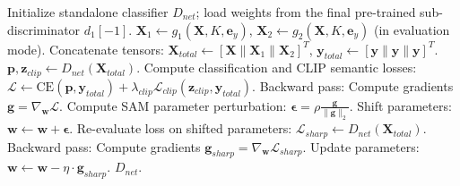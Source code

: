 \begin{algorithm}[H]
\begin{algorithmic}[1]
\STATE {}
\STATE Initialize standalone classifier $D_{net}$; load weights from the final pre-trained sub-discriminator $d_1[-1]$.
        \STATE $\mathbf{X}_1 \leftarrow g_1(\mathbf{X}, K, \mathbf{e}_y)$, $\mathbf{X}_2 \leftarrow g_2(\mathbf{X}, K, \mathbf{e}_y)$ (in evaluation mode).
        \STATE Concatenate tensors: $\mathbf{X}_{total} \leftarrow [\mathbf{X} \parallel \mathbf{X}_1 \parallel \mathbf{X}_2]^T$, $\mathbf{y}_{total} \leftarrow [\mathbf{y} \parallel \mathbf{y} \parallel \mathbf{y}]^T$.
        \STATE $\mathbf{p}, \mathbf{z}_{clip} \leftarrow D_{net}(\mathbf{X}_{total})$.
        \STATE Compute classification and CLIP semantic losses: $\mathcal{L} \leftarrow \text{CE}(\mathbf{p}, \mathbf{y}_{total}) + \lambda_{clip} \mathcal{L}_{clip}(\mathbf{z}_{clip}, \mathbf{y}_{total})$.
        \STATE Backward pass: Compute gradients $\mathbf{g} = \nabla_{\mathbf{w}} \mathcal{L}$.
        \STATE Compute SAM parameter perturbation: $\mathbf{\epsilon} = \rho \frac{\mathbf{g}}{\|\mathbf{g}\|_2}$.
        \STATE Shift parameters: $\mathbf{w} \leftarrow \mathbf{w} + \mathbf{\epsilon}$.
        \STATE Re-evaluate loss on shifted parameters: $\mathcal{L}_{sharp} \leftarrow D_{net}(\mathbf{X}_{total})$.
        \STATE Backward pass: Compute gradients $\mathbf{g}_{sharp} = \nabla_{\mathbf{w}} \mathcal{L}_{sharp}$.
        \STATE Update parameters: $\mathbf{w} \leftarrow \mathbf{w} - \eta \cdot \mathbf{g}_{sharp}$.
    \ENDFOR
\ENDFOR
\RETURN $D_{net}$.
\end{algorithmic}
\end{algorithm}
